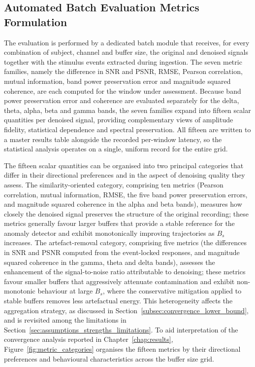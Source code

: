 \documentclass[MScCS,12pt,oneside,final]{uccthesis}
\begin{document}
\subsection{Automated Batch Evaluation Metrics Formulation}
\label{subsec:automated_batch_metrics}
 
The evaluation is performed by a dedicated batch module that receives, for every combination of subject, channel and buffer size, the original and denoised signals together with the stimulus events extracted during ingestion. The seven metric families, namely the difference in SNR and PSNR, RMSE, Pearson correlation, mutual information, band power preservation error and magnitude squared coherence, are each computed for the window under assessment. Because band power preservation error and coherence are evaluated separately for the delta, theta, alpha, beta and gamma bands, the seven families expand into fifteen scalar quantities per denoised signal, providing complementary views of amplitude fidelity, statistical dependence and spectral preservation. All fifteen are written to a master results table alongside the recorded per-window latency, so the statistical analysis operates on a single, uniform record for the entire grid.

The fifteen scalar quantities can be organised into two principal categories that differ in their directional preferences and in the aspect of denoising quality they assess. The similarity-oriented category, comprising ten metrics (Pearson correlation, mutual information, RMSE, the five band power preservation errors, and magnitude squared coherence in the alpha and beta bands), measures how closely the denoised signal preserves the structure of the original recording; these metrics generally favour larger buffers that provide a stable reference for the anomaly detector and exhibit monotonically improving trajectories as $B_s$ increases. The artefact-removal category, comprising five metrics (the differences in SNR and PSNR computed from the event-locked responses, and magnitude squared coherence in the gamma, theta and delta bands), assesses the enhancement of the signal-to-noise ratio attributable to denoising; these metrics favour smaller buffers that aggressively attenuate contamination and exhibit non-monotonic behaviour at large $B_s$, where the conservative mitigation applied to stable buffers removes less artefactual energy. This heterogeneity affects the aggregation strategy, as discussed in  Section~\ref{subsec:convergence_lower_bound}, and is revisited among the limitations in Section~\ref{sec:assumptions_strengths_limitations}. To aid interpretation of the convergence analysis reported in Chapter~\ref{chap:results}, Figure~\ref{fig:metric_categories} organises the fifteen metrics by their directional preferences and behavioural characteristics across the buffer size grid.
\end{document}
